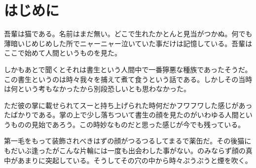 \documentclass[a5paper]{ltjsarticle}
\begin{document}
\section{はじめに}
吾輩は猫である。名前はまだ無い。どこで生れたかとんと見当がつかぬ。何でも薄暗いじめじめした所でニャーニャー泣いていた事だけは記憶している。吾輩はここで始めて人間というものを見た。

しかもあとで聞くとそれは書生という人間中で一番獰悪な種族であったそうだ。この書生というのは時々我々を捕えて煮て食うという話である。しかしその当時は何という考もなかったから別段恐しいとも思わなかった。

ただ彼の掌に載せられてスーと持ち上げられた時何だかフワフワした感じがあったばかりである。掌の上で少し落ちついて書生の顔を見たのがいわゆる人間というものの見始であろう。この時妙なものだと思った感じが今でも残っている。

第一毛をもって装飾されべきはずの顔がつるつるしてまるで薬缶だ。その後猫にもだいぶ逢ったがこんな片輪には一度も出会わした事がない。のみならず顔の真中があまりに突起している。そうしてその穴の中から時々ぷうぷうと煙を吹く。
\end{document}
